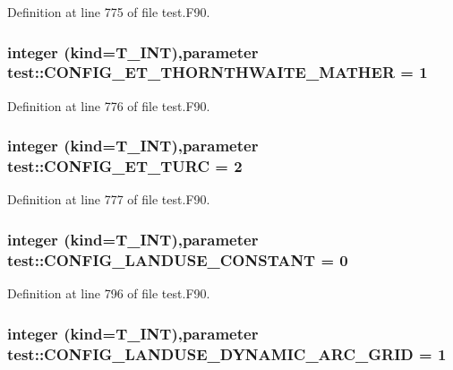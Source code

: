 Definition at line 775 of file test.F90.

\hypertarget{namespacetest_a10c79733bc37cb1c88dd6f84d08c2012}{
\subsubsection[{CONFIG\_\-ET\_\-THORNTHWAITE\_\-MATHER}]{\setlength{\rightskip}{0pt plus 5cm}integer (kind={\bf T\_\-INT}),parameter {\bf test::CONFIG\_\-ET\_\-THORNTHWAITE\_\-MATHER} = 1}}
\label{namespacetest_a10c79733bc37cb1c88dd6f84d08c2012}


Definition at line 776 of file test.F90.

\hypertarget{namespacetest_a9281ad856dadeb5f57137bd0e6219fa9}{
\subsubsection[{CONFIG\_\-ET\_\-TURC}]{\setlength{\rightskip}{0pt plus 5cm}integer (kind={\bf T\_\-INT}),parameter {\bf test::CONFIG\_\-ET\_\-TURC} = 2}}
\label{namespacetest_a9281ad856dadeb5f57137bd0e6219fa9}


Definition at line 777 of file test.F90.

\hypertarget{namespacetest_aee066d92ba29f5a5855e38b1ec0bf25b}{
\subsubsection[{CONFIG\_\-LANDUSE\_\-CONSTANT}]{\setlength{\rightskip}{0pt plus 5cm}integer (kind={\bf T\_\-INT}),parameter {\bf test::CONFIG\_\-LANDUSE\_\-CONSTANT} = 0}}
\label{namespacetest_aee066d92ba29f5a5855e38b1ec0bf25b}


Definition at line 796 of file test.F90.

\hypertarget{namespacetest_ac65abaea28ba58903b2d4f2b096b661c}{
\subsubsection[{CONFIG\_\-LANDUSE\_\-DYNAMIC\_\-ARC\_\-GRID}]{\setlength{\rightskip}{0pt plus 5cm}integer (kind={\bf T\_\-INT}),parameter {\bf test::CONFIG\_\-LANDUSE\_\-DYNAMIC\_\-ARC\_\-GRID} = 1}}
\label{namespacetest_ac65abaea28ba58903b2d4f2b096b661c}


